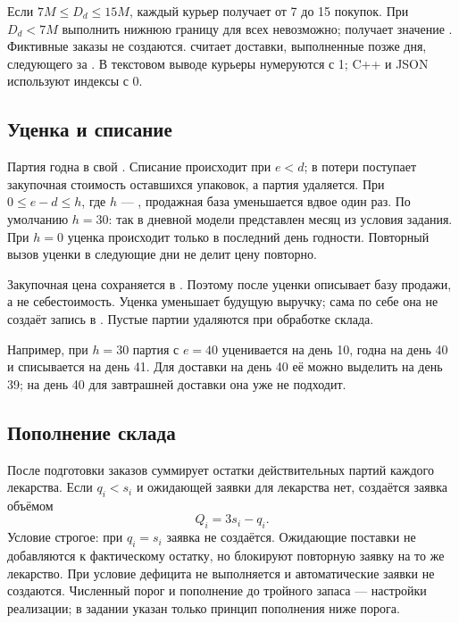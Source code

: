 Если $7M\leq D_d\leq15M$, каждый курьер получает от 7 до 15 покупок.
При $D_d<7M$ выполнить нижнюю границу для всех невозможно;
 получает значение .
Фиктивные заказы не создаются.  считает доставки,
выполненные позже дня, следующего за .
В текстовом выводе курьеры нумеруются с 1; C++ и JSON используют индексы с 0.

\subsection{Уценка и списание}
Партия годна в свой . Списание происходит при $e<d$;
в потери поступает закупочная стоимость оставшихся упаковок, а партия удаляется.
При $0\leq e-d\leq h$, где $h$ --- , продажная база
уменьшается вдвое один раз. По умолчанию $h=30$: так в дневной модели
представлен месяц из условия задания. При $h=0$ уценка происходит только
в последний день годности.
Повторный вызов уценки в следующие дни не делит цену повторно.

Закупочная цена сохраняется в . Поэтому
 после уценки описывает базу продажи, а не
себестоимость. Уценка уменьшает будущую выручку; сама по себе она не создаёт
запись в . Пустые партии удаляются при обработке склада.

Например, при $h=30$ партия с $e=40$ уценивается на день 10, годна на день 40 и списывается
на день 41. Для доставки на день 40 её можно выделить на день 39;
на день 40 для завтрашней доставки она уже не подходит.

\subsection{Пополнение склада}
После подготовки заказов  суммирует остатки действительных
партий каждого лекарства. Если $q_i<s_i$ и ожидающей заявки для лекарства нет,
создаётся заявка объёмом
\begin{equation}
  Q_i=3s_i-q_i.
\end{equation}
Условие строгое: при $q_i=s_i$ заявка не создаётся. Ожидающие поставки
не добавляются к фактическому остатку, но блокируют повторную заявку на
то же лекарство.
При  условие дефицита не выполняется и автоматические
заявки не создаются. Численный порог и пополнение до тройного запаса ---
настройки реализации; в задании указан только принцип пополнения ниже порога.


